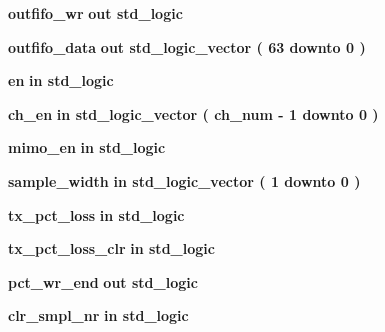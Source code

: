 \begin{DoxyCompactItemize}
\item 
{\bf outfifo\+\_\+wr}  {\bfseries {\bfseries \textcolor{keywordflow}{out}\textcolor{vhdlchar}{ }}} {\bfseries \textcolor{comment}{std\+\_\+logic}\textcolor{vhdlchar}{ }} 
\item 
{\bf outfifo\+\_\+data}  {\bfseries {\bfseries \textcolor{keywordflow}{out}\textcolor{vhdlchar}{ }}} {\bfseries \textcolor{comment}{std\+\_\+logic\+\_\+vector}\textcolor{vhdlchar}{ }\textcolor{vhdlchar}{(}\textcolor{vhdlchar}{ }\textcolor{vhdlchar}{ } \textcolor{vhdldigit}{63} \textcolor{vhdlchar}{ }\textcolor{keywordflow}{downto}\textcolor{vhdlchar}{ }\textcolor{vhdlchar}{ } \textcolor{vhdldigit}{0} \textcolor{vhdlchar}{ }\textcolor{vhdlchar}{)}\textcolor{vhdlchar}{ }} 
\item 
{\bf en}  {\bfseries {\bfseries \textcolor{keywordflow}{in}\textcolor{vhdlchar}{ }}} {\bfseries \textcolor{comment}{std\+\_\+logic}\textcolor{vhdlchar}{ }} 
\item 
{\bf ch\+\_\+en}  {\bfseries {\bfseries \textcolor{keywordflow}{in}\textcolor{vhdlchar}{ }}} {\bfseries \textcolor{comment}{std\+\_\+logic\+\_\+vector}\textcolor{vhdlchar}{ }\textcolor{vhdlchar}{(}\textcolor{vhdlchar}{ }\textcolor{vhdlchar}{ }\textcolor{vhdlchar}{ }\textcolor{vhdlchar}{ }{\bfseries {\bf ch\+\_\+num}} \textcolor{vhdlchar}{-\/}\textcolor{vhdlchar}{ } \textcolor{vhdldigit}{1} \textcolor{vhdlchar}{ }\textcolor{keywordflow}{downto}\textcolor{vhdlchar}{ }\textcolor{vhdlchar}{ } \textcolor{vhdldigit}{0} \textcolor{vhdlchar}{ }\textcolor{vhdlchar}{)}\textcolor{vhdlchar}{ }} 
\item 
{\bf mimo\+\_\+en}  {\bfseries {\bfseries \textcolor{keywordflow}{in}\textcolor{vhdlchar}{ }}} {\bfseries \textcolor{comment}{std\+\_\+logic}\textcolor{vhdlchar}{ }} 
\item 
{\bf sample\+\_\+width}  {\bfseries {\bfseries \textcolor{keywordflow}{in}\textcolor{vhdlchar}{ }}} {\bfseries \textcolor{comment}{std\+\_\+logic\+\_\+vector}\textcolor{vhdlchar}{ }\textcolor{vhdlchar}{(}\textcolor{vhdlchar}{ }\textcolor{vhdlchar}{ } \textcolor{vhdldigit}{1} \textcolor{vhdlchar}{ }\textcolor{keywordflow}{downto}\textcolor{vhdlchar}{ }\textcolor{vhdlchar}{ } \textcolor{vhdldigit}{0} \textcolor{vhdlchar}{ }\textcolor{vhdlchar}{)}\textcolor{vhdlchar}{ }} 
\item 
{\bf tx\+\_\+pct\+\_\+loss}  {\bfseries {\bfseries \textcolor{keywordflow}{in}\textcolor{vhdlchar}{ }}} {\bfseries \textcolor{comment}{std\+\_\+logic}\textcolor{vhdlchar}{ }} 
\item 
{\bf tx\+\_\+pct\+\_\+loss\+\_\+clr}  {\bfseries {\bfseries \textcolor{keywordflow}{in}\textcolor{vhdlchar}{ }}} {\bfseries \textcolor{comment}{std\+\_\+logic}\textcolor{vhdlchar}{ }} 
\item 
{\bf pct\+\_\+wr\+\_\+end}  {\bfseries {\bfseries \textcolor{keywordflow}{out}\textcolor{vhdlchar}{ }}} {\bfseries \textcolor{comment}{std\+\_\+logic}\textcolor{vhdlchar}{ }} 
\item 
{\bf clr\+\_\+smpl\+\_\+nr}  {\bfseries {\bfseries \textcolor{keywordflow}{in}\textcolor{vhdlchar}{ }}} {\bfseries \textcolor{comment}{std\+\_\+logic}\textcolor{vhdlchar}{ }} 
\end{DoxyCompactItemize}


